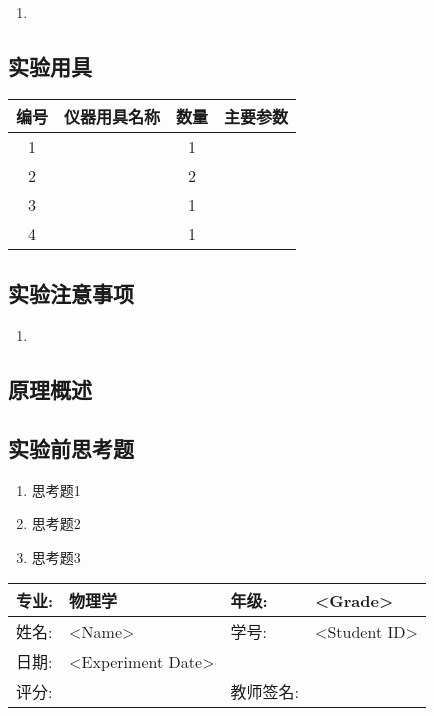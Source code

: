 \documentclass{ctexart}
\newcommand{\student}{<Name>}
\newcommand{\Grade}{<Grade>}
\newcommand{\stuID}{<Student ID>}
\newcommand{\experimentdate}{<Experiment Date>}
\theoremstyle{ansstyle}
\newcommand{\experimentdata}{%
    \begin{center}
        \begin{tabular}{|p{2cm}|p{4cm}|p{4cm}|p{4cm}|}
            \hline
            专业:  & 物理学 & 年级:  & \Grade \\
            \hline
            姓名:  & \student & 学号:  & \stuID \\
            \hline
            日期:  & \experimentdate & & \\
            \hline
            评分:  &   & 教师签名: & \\
            \hline
        \end{tabular}
    \end{center}%
}
\begin{document}
\begin{enumerate}
    \item 
\end{enumerate}

\subsection{实验用具}
\begin{table}[H]
\begin{center}
    \begin{tabular}{|c|c|c|p{8cm}|}%
        \hline
        编号 & 仪器用具名称 & 数量 & 主要参数 \\
        \hline
        1 &  & 1 &  \\ %
        \hline
        2 &  & 2 &  \\
        \hline
        3  &   & 1 &  \\
        \hline
        4  &   & 1 &  \\
        \hline
    \end{tabular}
\end{center}
\end{table}

\subsection{实验注意事项}

\begin{enumerate}
    \item 
\end{enumerate}

\subsection{原理概述}


\subsection{实验前思考题}
\begin{enumerate}
    \item 思考题1
    \item 思考题2
    \item 思考题3
\end{enumerate}

\newpage

\experimentdata

\end{document}
